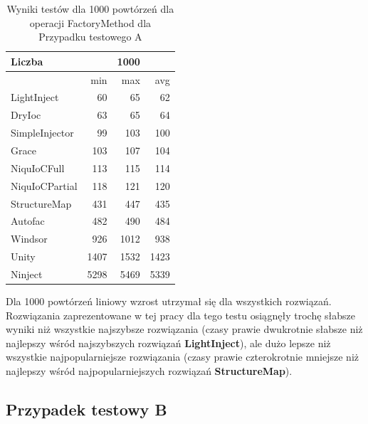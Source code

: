 \documentclass[12pt]{article}
\begin{document}
\begin{table}[H]
\captionsetup{belowskip=0pt,aboveskip=0pt}
\begin{center}
\begin{small}
	\begin{tabular}{ | l | r r r | }
    		\hline
Liczba & & 1000 & \\ \hline
 & min & max & avg \\ \hline
LightInject & 60 & 65 & 62 \\ \hline
DryIoc & 63 & 65 & 64 \\ \hline
SimpleInjector & 99 & 103 & 100 \\ \hline
Grace & 103 & 107 & 104 \\ \hline
NiquIoCFull & 113 & 115 & 114 \\ \hline
NiquIoCPartial & 118 & 121 & 120 \\ \hline
StructureMap & 431 & 447 & 435 \\ \hline
Autofac & 482 & 490 & 484 \\ \hline
Windsor & 926 & 1012 & 938 \\ \hline
Unity & 1407 & 1532 & 1423 \\ \hline
Ninject & 5298 & 5469 & 5339 \\ \hline
  	\end{tabular}
\end{small}
\end{center}
\caption{Wyniki testów dla 1000 powtórzeń dla operacji FactoryMethod dla Przypadku testowego A}
\label{TestCaseA_FactoryMethod1000}
\end{table}
Dla 1000 powtórzeń liniowy wzrost utrzymał się dla wszystkich rozwiązań. Rozwiązania zaprezentowane w tej pracy dla tego testu osiągnęły trochę słabsze wyniki niż wszystkie najszybsze rozwiązania (czasy prawie dwukrotnie słabsze niż najlepszy wśród najszybszych rozwiązań \textbf{LightInject}), ale dużo lepsze niż wszystkie najpopularniejsze rozwiązania (czasy prawie czterokrotnie mniejsze niż najlepszy wśród najpopularniejszych rozwiązań \textbf{StructureMap}).


\subsection{Przypadek testowy B}
\end{document}
